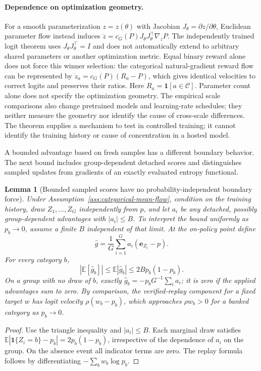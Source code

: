 \documentclass{article}
\newcommand{\1}{\mathbf 1}
\newcommand{\E}{\mathbb E}
\newtheorem{lemma}{Lemma}[section]
\theoremstyle{remark}
\theoremstyle{definition}
\theoremstyle{plain}
\begin{document}
\paragraph{Dependence on optimization geometry.}
For a smooth parameterization $z=z(\theta)$ with Jacobian
$J_\theta=\partial z/\partial\theta$, Euclidean parameter flow instead
induces $\dot z=c_G(P)J_\theta J_\theta^\top\nabla_zP$. The independently
trained logit theorem uses $J_\theta J_\theta^\top=I$ and does not automatically
extend to arbitrary shared parameters or another optimization metric. Equal
binary reward alone does not force this winner selection: the categorical
natural-gradient reward flow can be represented by
$\dot z_a=c_G(P)(R_a-P)$, which gives identical velocities to correct logits
and preserves their ratios. Here $R_a=\1[a\in\mathcal C]$.
Parameter count alone does not specify the optimization geometry. The empirical
scale
comparisons also change pretrained models and learning-rate schedules; they
neither measure the geometry nor identify the cause of cross-scale differences.
The theorem supplies a mechanism to test in controlled training; it cannot
identify the training history or cause of concentration in a hosted model.

A bounded advantage based on fresh samples has a different boundary behavior.
The next bound includes group-dependent detached scores and distinguishes
sampled updates from gradients of an exactly evaluated entropy functional.

\begin{lemma}[Bounded sampled scores have no probability-independent boundary force]
\label{lem:sampled-score-bound}
Under Assumption~\ref{ass:categorical-mean-flow}, condition on the training history, draw
$Z_1,\ldots,Z_G$ independently from $p$, and let $a_i$ be any detached,
possibly group-dependent advantages with $|a_i|\le B$. To interpret the
bound uniformly as $p_b\to0$, assume a finite $B$ independent of that limit.
At the on-policy point define
\[
 \widehat g=\frac1G\sum_{i=1}^G a_i(\mathbf e_{Z_i}-p).
\]
For every category $b$,
\[
 |\E[\widehat g_b]|\le\E|\widehat g_b|
 \le 2B p_b(1-p_b).
\]
On a group with no draw of $b$, exactly
$\widehat g_b=-p_bG^{-1}\sum_i a_i$; it is zero if the applied advantages
sum to zero. By comparison, the verified-replay component for a fixed target
$w$ has logit velocity $\rho(w_b-p_b)$, which approaches $\rho w_b>0$
for a banked category as $p_b\to0$.
\end{lemma}

\begin{proof}
Use the triangle inequality and $|a_i|\le B$. Each marginal draw satisfies
$\E|\1\{Z_i=b\}-p_b|=2p_b(1-p_b)$, irrespective of the dependence of
$a_i$ on the group. On the absence event all indicator terms are zero.
The replay formula follows by differentiating $-\sum_b w_b\log p_b$.
\end{proof}
\end{document}
